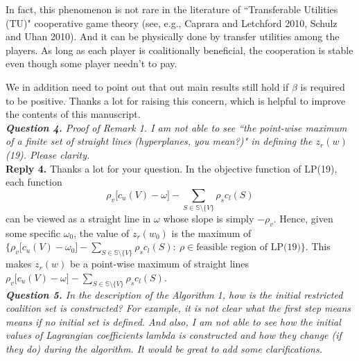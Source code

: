 \documentclass[11pt]{article}
\begin{document}
In fact, this phenomenon is not rare in the literature of ``Transferable Utilities (TU)" cooperative game theory (see, e.g., Caprara and Letchford 2010, Schulz and Uhan 2010).
And it can be physically done by transfer utilities among the players.
As long as each player is coalitionally beneficial, the cooperation is stable even though some player needn't to pay. 

We in addition need to point out that out main results still hold if $\beta$ is required to be positive.
Thanks a lot for raising this concern, which is helpful to improve the contents of this manuscript.
\\[4mm]
%
%
\noindent \textit{\textbf{Question 4.}
Proof of Remark 1. I am not able to see ``the point-wise maximum of a finite set of straight lines (hyperplanes, you mean?)" in defining the $z_r(w)$ (19). Please clarity.}
\\[2mm]
\noindent \textbf{Reply 4.}
Thanks a lot for your question. In the objective function of LP(19), each function 
$$\rho_v \big[ c_u(V)-\omega \big] - \sum_{S \in \mathbb{S} \setminus \{V\}} \rho_s c_l(S)$$
can be viewed as a straight line in $\omega$ whose slope is simply $-\rho_v$.
Hence, given some specific $\omega_0$, the value of $z_r(w_0)$ is the maximum of $\big\{\rho_v \big[ c_u(V)-\omega_0 \big] - \sum_{S \in \mathbb{S} \setminus \{V\}} \rho_s c_l(S):~\rho \in \text{feasible region of LP(19)} \big\}$.
This makes $z_r(w)$ be a point-wise maximum of straight lines $\rho_v \big[ c_u(V)-\omega \big] - \sum_{S \in \mathbb{S} \setminus \{V\}} \rho_s c_l(S)$.
\\[4mm]
%
%
%
\noindent \textit{\textbf{Question 5.}
In the description of the Algorithm 1, how is the initial restricted coalition set is constructed? For example, it is not clear what the first step means means if no initial set is defined. And also, I am not able to see how the initial values of Lagrangian coefficients lambda is constructed and how they change (if they do) during the algorithm. It would be great to add some clarifications.}
\end{document}
